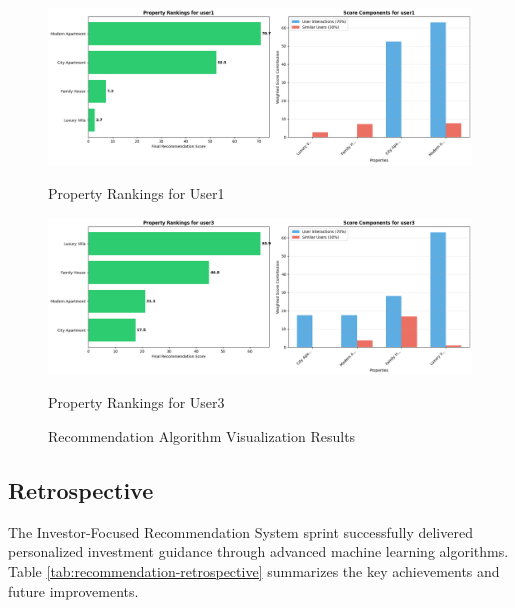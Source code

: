 \begin{figure}[htbp]
    \centering
    \begin{minipage}{0.8\textwidth}
        \centering
        \includegraphics[width=\linewidth]{images/recommendation_user1_rankings.png}
        \caption*{Property Rankings for User1}
    \end{minipage}
    
    \begin{minipage}{0.8\textwidth}
        \centering
        \includegraphics[width=\linewidth]{images/recommendation_user3_rankings.png}
        \caption*{Property Rankings for User3}
    \end{minipage}
    
    \caption{Recommendation Algorithm Visualization Results}
    \label{fig:recommendation-visualization}
\end{figure}

\subsection{Retrospective}

The Investor-Focused Recommendation System sprint successfully delivered personalized investment guidance through advanced machine learning algorithms. Table \ref{tab:recommendation-retrospective} summarizes the key achievements and future improvements.


